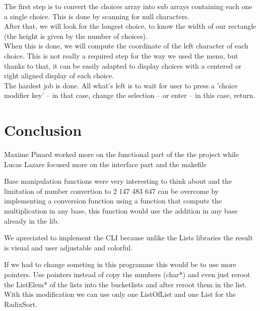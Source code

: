 \documentclass[book, backcover, english, nodocumentinfo]{upmethodology-document}
\begin{document}
		The first step is to convert the choices array into sub arrays containing each one a single choice. This is done by scanning for null characters.\\
		After that, we will look for the longest choice, to know the width of our rectangle (the height is given by the number of choices).\\
		When this is done, we will compute the coordinate of the left character of each choice. This is not really a required step for the way we used the menu, but thanks to that, it can be easily adapted to display choices with a centered or right aligned display of each choice.\\
		The hardest job is done. All what's left is to wait for user to press a 'choice modifier key' -- in that case, change the selection -- or enter -- in this case, return.\\


\chapter{Conclusion} \label{chapter:Conclusion}
	Maxime Pinard worked more on the functional part of the the project while Lucas Lazare focused more on the interface part and the makefile

	Base manipulation functions were very interesting to think about and the limitation of number convertion to 2 147 483 647 can be overcome by implementing a conversion function using a function that compute the multiplication in any base, this function would use the addition in any base already in the lib.

	We apreciated to implement the CLI because unlike the Lists libraries the result is visual and user adjustable and colorful.

	If we had to change someting in this programme this would be to use more pointers.
	Use pointers instead of copy the numbers (char*) and even just reroot the ListElem* of the lists into the bucketlists and after reroot them in the list. With this modification we can use only one ListOfList and one List for the RadixSort.
\end{document}

